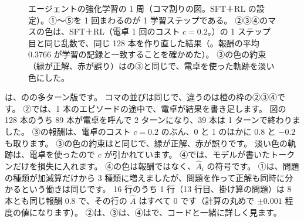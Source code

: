 \begin{figure}[tbp]
\begin{tikzpicture}
\end{tikzpicture}
\caption{エージェントの強化学習の 1 周（コマ割りの図。SFT＋RL の設定）。①〜⑤を 1 回まわるのが 1 学習ステップである。
②③④のマスの色は、SFT＋RL（電卓 1 回のコスト $c=0.2$。）の 1 ステップ目と同じ乱数で、同じ 128 本を作り直した結果（。報酬の平均 0.3766 が学習の記録と一致することを確かめた）。
③の色の約束（緑が正解、赤が誤り）はの③と同じで、電卓を使った軌跡を淡い色にした。}
\label{fig:arl-cycle}
\end{figure}

は、のの多ターン版です。
コマの並びは同じで、違うのは橙の枠の②③④です。
②では、1 本のエピソードの途中で、電卓が結果を書き足します。
図の 128 本のうち 89 本が電卓を呼んで 2 ターンになり、39 本は 1 ターンで終わりました。
③の報酬は、電卓のコスト $c=0.2$ のぶん、0 と 1 のほかに 0.8 と $-0.2$ も取ります。
③の色の約束はと同じで、緑が正解、赤が誤りです。
淡い色の軌跡は、電卓を使ったので $c$ が引かれています。
④では、モデルが書いたトークンだけを損失に入れます。
④の色は報酬ではなく、$\hat A_i$ の符号です。
①は、問題の種類が加減算だけから 3 種類に増えましたが、問題を作って正解も同時に分かるという働きは同じです。
16 行のうち 1 行（13 行目、掛け算の問題）は 8 本とも同じ報酬 0.8 で、その行の $\hat A$ はすべて 0 です（計算の丸めで $\pm0.001$ 程度の値になります）。
②は、③は、④はで、コードと一緒に詳しく見ます。

